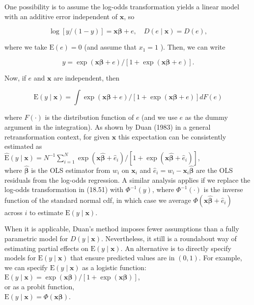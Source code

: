 \documentclass[10pt]{article}
\begin{document}
One possibility is to assume the log-odds transformation yields a linear model with an additive error independent of $\mathbf{x}$, so


\begin{equation*}
\log [y /(1-y)]=\mathbf{x} \boldsymbol{\beta}+e, \quad D(e \mid \mathbf{x})=D(e), \tag{18.51}
\end{equation*}


where we take $\mathrm{E}(e)=0$ (and assume that $x_{1}=1$ ). Then, we can write


\begin{equation*}
y=\exp (\mathbf{x} \boldsymbol{\beta}+e) /[1+\exp (\mathbf{x} \boldsymbol{\beta}+e)] . \tag{18.52}
\end{equation*}


Now, if $e$ and $\mathbf{x}$ are independent, then


\begin{equation*}
\mathrm{E}(y \mid \mathbf{x})=\int \exp (\mathbf{x} \boldsymbol{\beta}+e) /[1+\exp (\mathbf{x} \boldsymbol{\beta}+e)] d F(e) \tag{18.53}
\end{equation*}


where $F(\cdot)$ is the distribution function of $e$ (and we use $e$ as the dummy argument in the integration). As shown by Duan (1983) in a general retransformation context, for given $\mathbf{x}$ this expectation can be consistently estimated as\\
$\hat{\mathrm{E}}(y \mid \mathbf{x})=N^{-1} \sum_{i=1}^{N} \exp \left(\mathbf{x} \hat{\boldsymbol{\beta}}+\hat{e}_{i}\right) /\left[1+\exp \left(\mathbf{x} \hat{\boldsymbol{\beta}}+\hat{e}_{i}\right)\right]$,\\
where $\hat{\boldsymbol{\beta}}$ is the OLS estimator from $w_{i}$ on $\mathbf{x}_{i}$ and $\hat{e}_{i}=w_{i}-\mathbf{x}_{i} \hat{\boldsymbol{\beta}}$ are the OLS residuals from the log-odds regression. A similar analysis applies if we replace the log-odds transformation in (18.51) with $\Phi^{-1}(y)$, where $\Phi^{-1}(\cdot)$ is the inverse function of the standard normal cdf, in which case we average $\Phi\left(\mathbf{x} \hat{\boldsymbol{\beta}}+\hat{e}_{i}\right)$ across $i$ to estimate $\mathrm{E}(y \mid \mathbf{x})$.

When it is applicable, Duan's method imposes fewer assumptions than a fully parametric model for $D(y \mid \mathbf{x})$. Nevertheless, it still is a roundabout way of estimating partial effects on $\mathrm{E}(y \mid \mathbf{x})$. An alternative is to directly specify models for $\mathrm{E}(y \mid \mathbf{x})$ that ensure predicted values are in $(0,1)$. For example, we can specify $\mathrm{E}(y \mid \mathbf{x})$ as a logistic function:\\
$\mathrm{E}(y \mid \mathbf{x})=\exp (\mathbf{x} \boldsymbol{\beta}) /[1+\exp (\mathbf{x} \boldsymbol{\beta})]$,\\
or as a probit function,\\
$\mathrm{E}(y \mid \mathbf{x})=\Phi(\mathbf{x} \boldsymbol{\beta})$.
\end{document}
